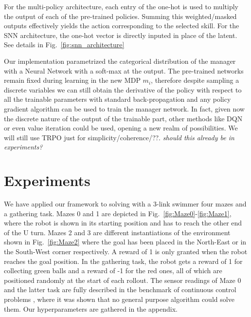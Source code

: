 \documentclass{article} %
\begin{document}
For the multi-policy architecture, each entry of the one-hot is used to multiply the output of each of the pre-trained policies. Summing this weighted/masked outputs effectively yields the action corresponding to the selected skill. For the SNN architecture, the one-hot vector is directly inputed in place of the latent. See details in Fig.\ \ref{fig:snn_architecture}

Our implementation parametrized the categorical distribution of the manager with a Neural Network with a soft-max at the output. The pre-trained networks remain fixed during learning in the new MDP $m_i$, therefore despite sampling a discrete variables we can still obtain the derivative of the policy with respect to all the trainable parameters with standard back-propagation and any policy gradient algorithm can be used to train the manager network. In fact, given now the discrete nature of the output of the trainable part, other methods like DQN or even value iteration could be used, opening a new realm of possibilities. We will still use TRPO just for simplicity/coherence/??. \textit{should this already be in experiments?}


\section{Experiments}
We have applied our framework to solving with a 3-link swimmer four mazes and a gathering task. Mazes 0 and 1 are depicted in Fig.\ \ref{fig:Maze0}-\ref{fig:Maze1}, where the robot is shown in its starting position and has to reach the other end of the U turn. Mazes 2 and 3 are different instantiations of the environment shown in Fig.\ \ref{fig:Maze2} where the goal has been placed in the North-East or in the South-West corner respectively. A reward of 1 is only granted when the robot reaches the goal position. In the gathering task, the robot gets a reward of 1 for collecting green balls and a reward of -1 for the red ones, all of which are positioned randomly at the start of each rollout. The sensor readings of Maze 0 and the latter task are fully described in the benchmark of continuous control problems \citep{yuan2015rllab}, where it was shown that no general purpose algorithm could solve them. Our hyperparameters are gathered in the appendix.
\end{document}
